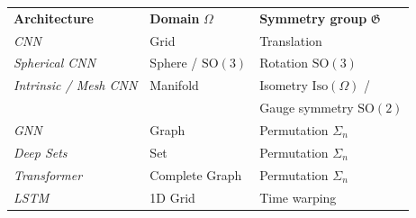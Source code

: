 \begin{tcolorbox}[width=\linewidth,
                  boxsep=0pt,
                  left=7.5pt,
                  right=7.5pt,
                  top=7.5pt,
                  bottom=7.5pt,
                  arc=0pt,
                  boxrule=0pt,toprule=0pt,
                  colback=boxgray,
                  ]%
    
\begin{center}
\begin{tabular}{lll}
     {\bf Architecture} & {\bf Domain} $\Omega$ & {\bf Symmetry group} $\mathfrak{G}$\vspace{2.5mm}\\
     {\em CNN} & Grid & Translation\vspace{2mm}\\
%
     {\em Spherical CNN} & Sphere / $\mathrm{SO}({3})$ & Rotation $\mathrm{SO}({3})$\vspace{2mm}\\

     {\em Intrinsic / Mesh CNN} & Manifold & Isometry $\mathrm{Iso}(\Omega)$ / \\
     & & Gauge symmetry $\mathrm{SO}(2)$\vspace{2mm}\\     


     {\em GNN} & Graph & Permutation  $\Sigma_n$\vspace{2mm}\\     

     {\em Deep Sets} & Set & Permutation $\Sigma_n$\vspace{2mm}\\     
     {\em Transformer} & Complete Graph & Permutation $\Sigma_n$\vspace{2mm}\\
     {\em LSTM} & 1D Grid & Time warping\\     


\end{tabular}
\end{center}
\end{tcolorbox}
%

